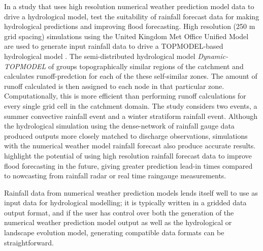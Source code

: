 In a study that uses high resolution numerical weather prediction model data to drive a hydrological model, \citet{younger2008usability} test the suitability of rainfall forecast data for making hydrological predictions and improving flood forecasting. High resolution (250 m grid spacing) simulations using the United Kingdom Met Office Unified Model are used to generate input rainfall data to drive a TOPMODEL-based hydrological model \citep{beven2001dynamic}. The semi-distributed hydrological model \textit{Dynamic-TOPMODEL} of \citet{beven2001dynamic} groups topographically similar regions of the catchment and calculates runoff-predction for each of the these self-similar zones. The amount of runoff calculated is then assigned to each node in that particular zone. Computationally, this is more efficient than performing runoff calculations for every single grid cell in the catchment domain.
The \citet{younger2008usability} study considers two events, a summer convective rainfall event and a winter stratiform rainfall event. Although the hydrological simulation using the dense-network of rainfall gauge data produced outputs more closely matched to discharge observations, simulations with the numerical weather model rainfall forecast also produce accurate results. \citet{younger2008usability} highlight the potential of using high resolution rainfall forecast data to improve flood forecasting in the future, giving greater prediction lead-in times compared to nowcasting from rainfall radar or real time raingauge measurements. 

Rainfall data from numerical weather prediction models lends itself well to use as input data for hydrological modelling; it is typically written in a gridded data output format, and if the user has control over both the generation of the numerical weather prediction model output as well as the hydrological or landscape evolution model, generating compatible data formats can be straightforward.

